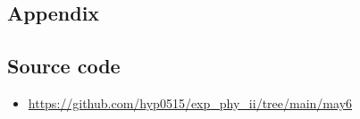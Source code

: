 \documentclass[12pt,a4paper]{article}
\begin{document}
\begin{CJK}{UTF8}{bkai}
\section{Appendix}

\subsection{Source code}

\begin{itemize}
    \item \url{https://github.com/hyp0515/exp_phy_ii/tree/main/may6}
\end{itemize}

\end{CJK}
\end{document}
